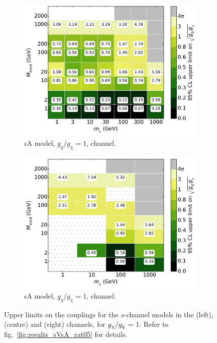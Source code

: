\begin{figure}
\begin{subfigure}[t]{0.32\textwidth}
    \includegraphics[width=1.\textwidth]{figures/grid_allpoints_SAD_rat1.pdf}
    \caption{sA model, $g_q/g_{\chi} = 1$, \monoZ channel.}
  \end{subfigure}
  \begin{subfigure}[t]{0.32\textwidth}
    \centering
    \includegraphics[width=1.\textwidth]{figures/grid_basepoints_SAD_rat1_monoWZ.pdf}
    \caption{sA model, $g_q/g_{\chi} = 1$, \monoWZ channel.}
  \end{subfigure}
  \caption{Upper limits on the couplings for the $s$-channel models in the \monojet (left), \monoZ (centre) and \monoWZ (right) channels, for $g_{\chi} / g_q$ = 1. Refer to fig.~\ref{fig:results_sVsA_rat05} for details.}
  \label{fig:results_sVsA_rat1}
\end{figure}

